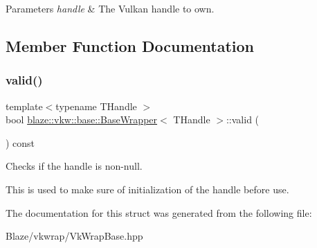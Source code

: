 \begin{DoxyParams}{Parameters}
{\em handle} & The Vulkan handle to own. \\
\hline
\end{DoxyParams}


\subsection{Member Function Documentation}
\mbox{\label{structblaze_1_1vkw_1_1base_1_1BaseWrapper_aa6499ac388955fe4a6a6b729f4a48ca8}} 
\subsubsection{\texorpdfstring{valid()}{valid()}}
{\footnotesize\ttfamily template$<$typename T\+Handle $>$ \\
bool \hyperlink{structblaze_1_1vkw_1_1base_1_1BaseWrapper}{blaze\+::vkw\+::base\+::\+Base\+Wrapper}$<$ T\+Handle $>$\+::valid (\begin{DoxyParamCaption}{ }\end{DoxyParamCaption}) const\hspace{0.3cm}{\ttfamily [inline]}}



Checks if the handle is non-\/null. 

This is used to make sure of initialization of the handle before use. 

The documentation for this struct was generated from the following file\+:\begin{DoxyCompactItemize}
\item 
Blaze/vkwrap/Vk\+Wrap\+Base.\+hpp\end{DoxyCompactItemize}
